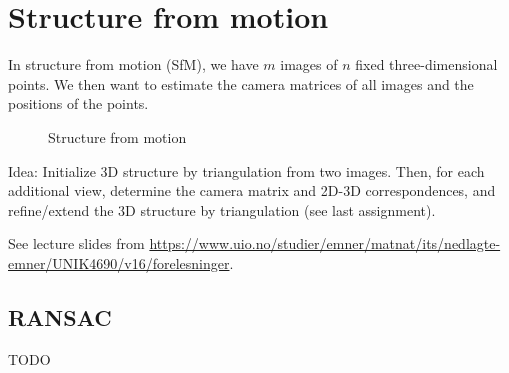 \section{Structure from motion} \label{sec:sfm}

In structure from motion (SfM), we have $m$ images of $n$ fixed
three-dimensional points. We then want to estimate the camera matrices of all
images and the positions of the points.

\begin{figure}[ht]
    \centering
    \caption{Structure from motion}
    \label{fig:structure-from-motion}
\end{figure}

Idea: Initialize 3D structure by triangulation from two images. Then, for each
additional view, determine the camera matrix and 2D-3D correspondences, and
refine/extend the 3D structure by triangulation (see last assignment).

See lecture slides from
\url{https://www.uio.no/studier/emner/matnat/its/nedlagte-emner/UNIK4690/v16/forelesninger}.

\subsection{RANSAC}

TODO
